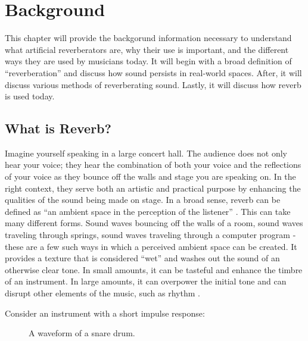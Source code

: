\chapter{Background}
\hspace*{-0.155cm}This chapter will provide the backgorund information necessary to understand what artificial reverberators are, why their use is important, and the different ways they are used by musicians today. It will begin with a broad definition of ``reverberation'' and discuss how sound persists in real-world spaces. After, it will discuss various methods of reverberating sound. Lastly, it will discuss how reverb is used today.

\section{What is Reverb?}
Imagine yourself speaking in a large concert hall. The audience does not only hear your voice; they hear the combination of both your voice and the reflections of your voice as they bounce off the walls and stage you are speaking on. In the right context, they serve both an artistic and practical purpose by enhancing the qualities of the sound being made on stage. In a broad sense, reverb can be defined as ``an ambient space in the perception of the listener'' \cite{dattorro1997effect}. This can take many different forms. Sound waves bouncing off the walls of a room, sound waves traveling through springs, sound waves traveling through a computer program - these are a few such ways in which a perceived ambient space can be created. It provides a texture that is considered ``wet'' and washes out the sound of an otherwise clear tone. In small amounts, it can be tasteful and enhance the timbre of an instrument. In large amounts, it can overpower the initial tone and can disrupt other elements of the music, such as rhythm \cite{blesser2007spaces}.

Consider an instrument with a short impulse response:

\begin{figure}[h] %
	\begin{center}
		\caption{A waveform of a snare drum.}
	\end{center}
\end{figure}

